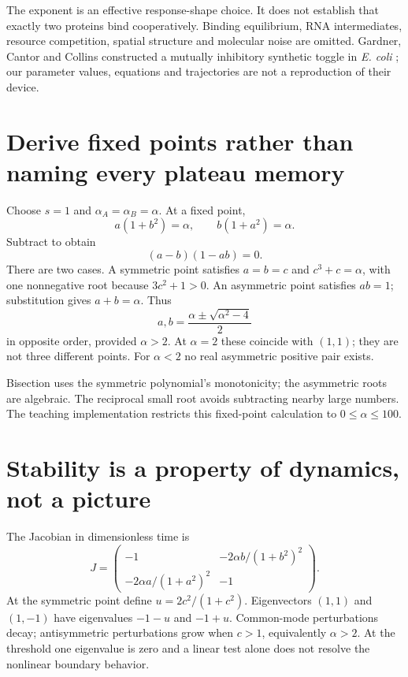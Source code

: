 The exponent is an effective response-shape choice. It does not establish that
exactly two proteins bind cooperatively. Binding equilibrium, RNA intermediates,
resource competition, spatial structure and molecular noise are omitted.
Gardner, Cantor and Collins constructed a mutually inhibitory synthetic toggle
in \emph{E. coli} \cite{Gardner2000}; our parameter values, equations and
trajectories are not a reproduction of their device.

\section{Derive fixed points rather than naming every plateau memory}
Choose $s=1$ and $\alpha_A=\alpha_B=\alpha$. At a fixed point,
\[
 a(1+b^2)=\alpha,\qquad b(1+a^2)=\alpha.
\]
Subtract to obtain
\[
 (a-b)(1-ab)=0.
\]
There are two cases. A symmetric point satisfies $a=b=c$ and
$c^3+c=\alpha$, with one nonnegative root because $3c^2+1>0$.
An asymmetric point satisfies $ab=1$; substitution gives $a+b=\alpha$.
Thus
\[
 a,b=\frac{\alpha\pm\sqrt{\alpha^2-4}}2
\]
in opposite order, provided $\alpha>2$. At $\alpha=2$ these coincide with
$(1,1)$; they are not three different points. For $\alpha<2$ no real
asymmetric positive pair exists.
\par\medskip\noindent\begin{minipage}{\linewidth}
\end{minipage}\par\medskip
Bisection uses the symmetric polynomial's monotonicity; the asymmetric roots
are algebraic. The reciprocal small root avoids subtracting nearby large numbers.
The teaching implementation restricts this fixed-point calculation to
$0\le\alpha\le100$.

\section{Stability is a property of dynamics, not a picture}
The Jacobian in dimensionless time is
\[
 J=\begin{pmatrix}
 -1 & -2\alpha b/(1+b^2)^2\\
 -2\alpha a/(1+a^2)^2 & -1
 \end{pmatrix}.
\]
At the symmetric point define $u=2c^2/(1+c^2)$.
Eigenvectors $(1,1)$ and $(1,-1)$ have eigenvalues $-1-u$ and $-1+u$.
Common-mode perturbations decay; antisymmetric perturbations grow when $c>1$,
equivalently $\alpha>2$. At the threshold one eigenvalue is zero and a linear
test alone does not resolve the nonlinear boundary behavior.

